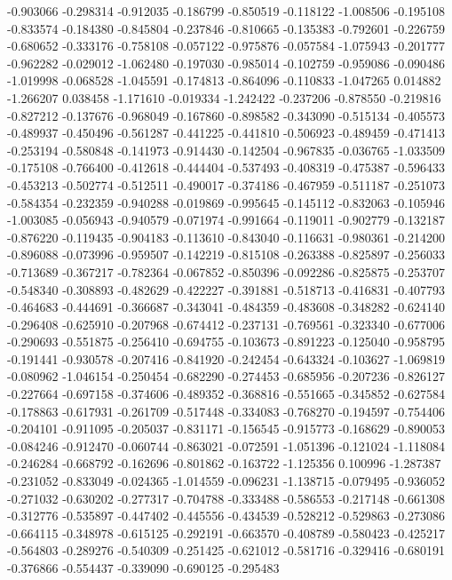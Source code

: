 -0.903066
-0.298314
-0.912035
-0.186799
-0.850519
-0.118122
-1.008506
-0.195108
-0.833574
-0.184380
-0.845804
-0.237846
-0.810665
-0.135383
-0.792601
-0.226759
-0.680652
-0.333176
-0.758108
-0.057122
-0.975876
-0.057584
-1.075943
-0.201777
-0.962282
-0.029012
-1.062480
-0.197030
-0.985014
-0.102759
-0.959086
-0.090486
-1.019998
-0.068528
-1.045591
-0.174813
-0.864096
-0.110833
-1.047265
0.014882
-1.266207
0.038458
-1.171610
-0.019334
-1.242422
-0.237206
-0.878550
-0.219816
-0.827212
-0.137676
-0.968049
-0.167860
-0.898582
-0.343090
-0.515134
-0.405573
-0.489937
-0.450496
-0.561287
-0.441225
-0.441810
-0.506923
-0.489459
-0.471413
-0.253194
-0.580848
-0.141973
-0.914430
-0.142504
-0.967835
-0.036765
-1.033509
-0.175108
-0.766400
-0.412618
-0.444404
-0.537493
-0.408319
-0.475387
-0.596433
-0.453213
-0.502774
-0.512511
-0.490017
-0.374186
-0.467959
-0.511187
-0.251073
-0.584354
-0.232359
-0.940288
-0.019869
-0.995645
-0.145112
-0.832063
-0.105946
-1.003085
-0.056943
-0.940579
-0.071974
-0.991664
-0.119011
-0.902779
-0.132187
-0.876220
-0.119435
-0.904183
-0.113610
-0.843040
-0.116631
-0.980361
-0.214200
-0.896088
-0.073996
-0.959507
-0.142219
-0.815108
-0.263388
-0.825897
-0.256033
-0.713689
-0.367217
-0.782364
-0.067852
-0.850396
-0.092286
-0.825875
-0.253707
-0.548340
-0.308893
-0.482629
-0.422227
-0.391881
-0.518713
-0.416831
-0.407793
-0.464683
-0.444691
-0.366687
-0.343041
-0.484359
-0.483608
-0.348282
-0.624140
-0.296408
-0.625910
-0.207968
-0.674412
-0.237131
-0.769561
-0.323340
-0.677006
-0.290693
-0.551875
-0.256410
-0.694755
-0.103673
-0.891223
-0.125040
-0.958795
-0.191441
-0.930578
-0.207416
-0.841920
-0.242454
-0.643324
-0.103627
-1.069819
-0.080962
-1.046154
-0.250454
-0.682290
-0.274453
-0.685956
-0.207236
-0.826127
-0.227664
-0.697158
-0.374606
-0.489352
-0.368816
-0.551665
-0.345852
-0.627584
-0.178863
-0.617931
-0.261709
-0.517448
-0.334083
-0.768270
-0.194597
-0.754406
-0.204101
-0.911095
-0.205037
-0.831171
-0.156545
-0.915773
-0.168629
-0.890053
-0.084246
-0.912470
-0.060744
-0.863021
-0.072591
-1.051396
-0.121024
-1.118084
-0.246284
-0.668792
-0.162696
-0.801862
-0.163722
-1.125356
0.100996
-1.287387
-0.231052
-0.833049
-0.024365
-1.014559
-0.096231
-1.138715
-0.079495
-0.936052
-0.271032
-0.630202
-0.277317
-0.704788
-0.333488
-0.586553
-0.217148
-0.661308
-0.312776
-0.535897
-0.447402
-0.445556
-0.434539
-0.528212
-0.529863
-0.273086
-0.664115
-0.348978
-0.615125
-0.292191
-0.663570
-0.408789
-0.580423
-0.425217
-0.564803
-0.289276
-0.540309
-0.251425
-0.621012
-0.581716
-0.329416
-0.680191
-0.376866
-0.554437
-0.339090
-0.690125
-0.295483
